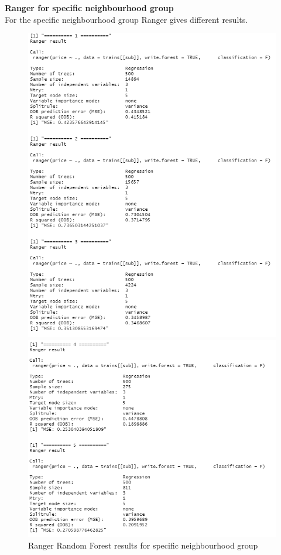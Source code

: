 \documentclass{FR16}
\begin{document}
\noindent \textbf{Ranger for specific neighbourhood group}\\
For the specific neighbourhood group Ranger gives different results. 
\begin{figure}[!htb]
   \begin{minipage}{0.48\textwidth}
     \centering
     \includegraphics[width=1\linewidth]{figures/rgn1.1.png} 
   \end{minipage}\hfill
   \begin{minipage}{0.48\textwidth}
     \centering
     \includegraphics[width=1\linewidth]{figures/rgn1.2.png}
   \end{minipage}
        \caption{Ranger Random Forest results for specific neighbourhood group}\label{fig:17}

\end{figure}
\end{document}
